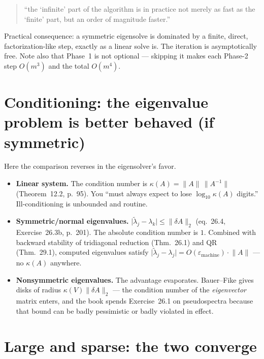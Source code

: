\documentclass[11pt,a4paper]{article}
\newcommand{\epsm}{\varepsilon_{\mathrm{machine}}}
\begin{document}
\begin{quote}
``the `infinite' part of the algorithm is in practice not merely as fast as the
`finite' part, but an order of magnitude faster.''
\end{quote}

Practical consequence: a symmetric eigensolve is dominated by a finite, direct,
factorization-like step, exactly as a linear solve is. The iteration is
asymptotically free. Note also that Phase~1 is not optional --- skipping it
makes each Phase-2 step $O(m^3)$ and the total $O(m^4)$.

\section{Conditioning: the eigenvalue problem is better behaved (if symmetric)}

Here the comparison reverses in the eigensolver's favor.

\begin{itemize}
  \item \textbf{Linear system.} The condition number is
        $\kappa(A) = \lVert A \rVert \, \lVert A^{-1} \rVert$
        (Theorem~12.2, p.~95). You ``must always expect to lose
        $\log_{10} \kappa(A)$ digits.'' Ill-conditioning is unbounded and
        routine.

  \item \textbf{Symmetric/normal eigenvalues.}
        $\lvert \tilde{\lambda}_j - \lambda_k \rvert \leq \lVert \delta A \rVert_2$
        (eq.~26.4, Exercise~26.3b, p.~201). The absolute condition number is
        $1$. Combined with backward stability of tridiagonal reduction
        (Thm.~26.1) and QR (Thm.~29.1), computed eigenvalues satisfy
        $\lvert \tilde{\lambda}_j - \lambda_j \rvert
         = O(\epsm) \cdot \lVert A \rVert$ --- no $\kappa(A)$ anywhere.

  \item \textbf{Nonsymmetric eigenvalues.} The advantage evaporates.
        Bauer--Fike gives disks of radius
        $\kappa(V) \lVert \delta A \rVert_2$ --- the condition number of the
        \emph{eigenvector} matrix enters, and the book spends Exercise~26.1 on
        pseudospectra because that bound can be badly pessimistic or badly
        violated in effect.
\end{itemize}

\section{Large and sparse: the two converge}
\end{document}
